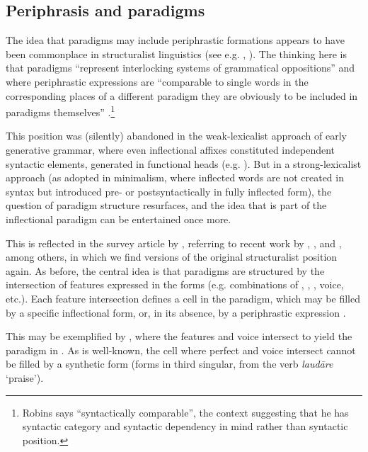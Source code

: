 \documentclass[output=paper]{LSP/langsci}
\begin{document}
\subsection{Periphrasis and paradigms}

The idea that paradigms may include periphrastic formations appears to have been commonplace in structuralist linguistics (see e.g. \citealt[124]{Robins1959}, \citealt[130]{Benveniste19651974}). The thinking here is that paradigms “represent interlocking systems of grammatical oppositions” and where periphrastic expressions are “comparable to single words in the corresponding places of a different paradigm they are obviously to be included in paradigms themselves” \citep[124]{Robins1959}.\footnote{Robins says ``syntactically comparable'', the context suggesting that he has syntactic category and syntactic dependency in mind rather than syntactic position.}

This position was (silently) abandoned in the weak-lexicalist approach of early generative grammar, where even inflectional affixes constituted independent syntactic elements, generated in functional heads (e.g. \citealt[52]{Chomsky1981}). But in a strong-lexicalist approach (as adopted in minimalism, where inflected words are not created in syntax but introduced pre- or postsyntactically in fully inflected form), the question of paradigm structure resurfaces, and the idea that  is part of the inflectional paradigm can be entertained once more.

This is reflected in the survey article by \citet[202f]{SpencerPopova2015}, referring to recent work by \citet{BörjarsEtAl1997}, \citet{Stump2001}, and \citet{AckermanStump2004}, among others, in which we find versions of the original structuralist position again. As before, the central idea is that paradigms are structured by the intersection of features expressed in the forms (e.g. combinations of , , , voice, etc.). Each feature intersection defines a cell in the paradigm, which may be filled by a specific inflectional form, or, in its absence, by a periphrastic expression \citep[14]{Stump2001}.

This may be exemplified by , where the features  and voice intersect to yield the paradigm in . As is well-known, the cell where perfect  and  voice intersect cannot be filled by a synthetic form (forms in third  singular, from the verb \textit{laud\=are} ‘praise’).
\end{document}
